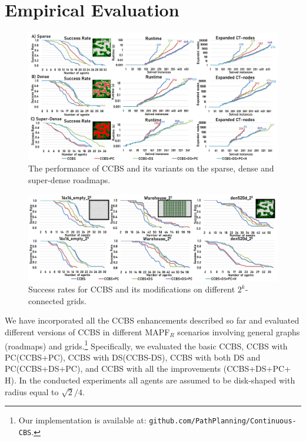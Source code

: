 \documentclass[letterpaper]{article} %
\newcommand{\ccbs}{\ac{CCBS}\xspace}
\newcommand{\ccbsds}{\ac{CCBS-DS}\xspace}
\newcommand{\mapfr}{{MAPF}$_R$\xspace}
\newcommand{\pc}{\ac{PC}\xspace}
\newcommand{\ds}{\ac{DS}\xspace}
\begin{document}

\section{Empirical Evaluation}

\begin{figure}[t]
    \centering
    \includegraphics[width=\textwidth]{Roadmaps_results.png}
    \caption{The performance of \ccbs and its variants on the sparse, dense and super-dense roadmaps.}
    \label{figRoadmapsResults}
\end{figure}

\begin{figure}[t]
    \centering
    \includegraphics[width=\textwidth]{Grids_SR_all.png}
    \caption{Success rates for \ccbs and its modifications on different $2^k$-connected grids.}
    \label{figGridsResults}
\end{figure}

We have incorporated all the \ccbs enhancements described so far and evaluated different versions of \ccbs in different \mapfr scenarios involving general graphs (roadmaps) and grids.\footnote{Our implementation is available at: \texttt{github.com/PathPlanning/Continuous-CBS}.} 
Specifically, we evaluated the basic \ccbs, \ccbs with \pc (\ccbs+\pc), \ccbs with \ds (\ccbsds), 
\ccbs with both \ds and \pc (\ccbs+\ds+\pc), 
and \ccbs with all the improvements (\ccbs+\ds+\pc + H). 
In the conducted experiments all agents are assumed to be disk-shaped with radius equal to $\sqrt{2}/4$. 
\end{document}
